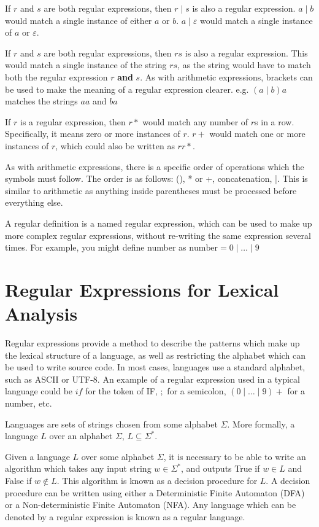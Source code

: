 If $r$ and $s$ are both regular expressions, then $r \mid s$ is also a regular expression. $a \mid b$ would match a
 single instance of either $a$ or $b$. $a \mid \varepsilon$ would match a single instance of $a$ or $\varepsilon$.

If $r$ and $s$ are both regular expressions, then $rs$ is also a regular expression. This would match a single instance
 of the string $rs$, as the string would have to match both the regular expression $r$ \textbf{and} $s$. As with
 arithmetic expressions, brackets can be used to make the meaning of a regular expression clearer. e.g. $(a \mid b)a$
 matches the strings $aa$ and $ba$

If $r$ is a regular expression, then $r*$ would match any number of $r$s in a row. Specifically, it means zero or more
 instances of $r$. $r+$ would match one or more instances of $r$, which could also be written as $rr*$.

As with arithmetic expressions, there is a specific order of operations which the symbols must follow. The order is as
 follows: (), * or +, concatenation, |. This is similar to arithmetic as anything inside parentheses must be processed
 before everything else.

A regular definition is a named regular expression, which can be used to make up more complex regular expressions,
 without re-writing the same expression several times. For example, you might define number as
 $\mathrm{number} = 0 \mid \dots \mid 9$

\section*{Regular Expressions for Lexical Analysis}

Regular expressions provide a method to describe the patterns which make up the lexical structure of a language, as
 well as restricting the alphabet which can be used to write source code. In most cases, languages use a standard
 alphabet, such as ASCII or UTF-8. An example of a regular expression used in a typical language could be $if$ for the
 token of IF, $;$ for a semicolon, $(0 \mid \dots \mid 9)+$ for a number, etc.

Languages are sets of strings chosen from some alphabet $\Sigma$. More formally, a language $L$ over an alphabet
 $\Sigma$, $L \subseteq \Sigma^*$.

Given a language $L$ over some alphabet $\Sigma$, it is necessary to be able to write an algorithm which takes any
 input string $w \in \Sigma^*$, and outputs True if $w \in L$ and False if $w \notin L$. This algorithm is known as a
 decision procedure for $L$. A decision procedure can be written using either a Deterministic Finite Automaton (DFA) or
 a Non-deterministic Finite Automaton (NFA). Any language which can be denoted by a regular expression is known as a
 regular language.